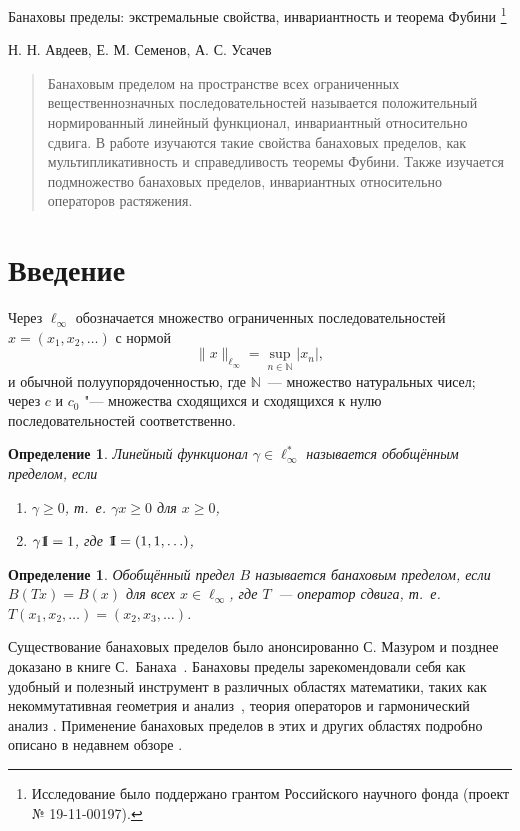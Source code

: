 \documentclass[12pt]{article}
\newcommand{\emm}{\mathrm{1\hspace{-0.3em} I}}
\newtheorem{dfn}[thm]{Определение}
\begin{document}
\begin{center}
{
	\Large Банаховы пределы: экстремальные свойства, инвариантность и теорема Фубини
	\footnote{
		Исследование было поддержано грантом Российского научного фонда (проект № 19-11-00197).

	}
}

Н. Н. Авдеев, Е. М. Семенов, А. С. Усачев
\end{center}

\begin{abstract}
Банаховым пределом на пространстве всех ограниченных вещественнозначных последовательностей называется положительный нормированный линейный функционал, инвариантный относительно сдвига. В работе изучаются такие свойства банаховых пределов, как мультипликативность и справедливость теоремы Фубини. Также изучается подмножество банаховых пределов, инвариантных относительно операторов растяжения.
\end{abstract}


\section{Введение}


Через $\ell_\infty$ обозначается множество ограниченных
последовательностей $x=(x_1,x_2,\ldots)$ с нормой
\[
 \|x\|_{\ell_\infty}=\sup_{n\in \mathbb N}|x_n|,
\]
и обычной полуупорядоченностью, где ${\mathbb N}$~--- множество натуральных чисел;
через $c$ и $c_0$ "--- множества сходящихся и сходящихся к нулю последовательностей соответственно.

\begin{dfn}
Линейный функционал $\gamma\in \ell_\infty^*$ называется обобщённым пределом,
если
\begin{enumerate}
    \item $\gamma\geqslant0$, т.~е. $\gamma x \geqslant 0$ для $x \geqslant 0$,
    \item $\gamma\emm=1$, где $\emm =(1,1,\ldots)$,
\end{enumerate}
\end{dfn}

\begin{dfn}
	Обобщённый предел $B$ называется банаховым пределом,
	если $B(Tx)=B(x)$ для всех $x\in \ell_\infty$, где $T$~---
    оператор сдвига, т.~е. $T(x_1,x_2,\ldots)=(x_2,x_3,\ldots)$.
\end{dfn}

Существование банаховых пределов было анонсированно С. Мазуром \cite{Mazur} и позднее доказано в книге С.~Банаха~\cite{banach2001theory_rus}.
Банаховы пределы зарекомендовали себя как удобный и полезный инструмент в различных областях математики, таких как некоммутативная геометрия и анализ~\cite{carey2006sledy}, теория операторов \cite{Sem_Sht} и гармонический анализ \cite{Ast_Sem, SU, U2}. Применение банаховых пределов в этих и других областях подробно описано в недавнем обзоре \cite{SSU_survey}.
\end{document}
